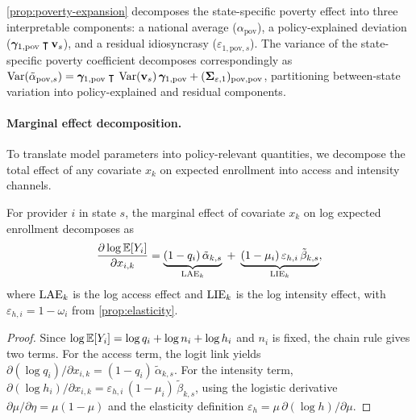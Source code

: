 \cref{prop:poverty-expansion} decomposes the state-specific poverty effect into
three interpretable components: a national average ($\alpha_{\mathrm{pov}}$), a
policy-explained deviation ($\boldsymbol{\gamma}_{1,\mathrm{pov}}\intercal\mathbf{v}_s$), and a residual
idiosyncrasy ($\varepsilon_{1,\mathrm{pov},s}$).  The variance of the
state-specific poverty coefficient decomposes correspondingly as
$\operatorname*{Var}(\tilde{\alpha}_{\mathrm{pov},s}) =
\boldsymbol{\gamma}_{1,\mathrm{pov}}\intercal\,\operatorname*{Var}(\mathbf{v}_s)\,\boldsymbol{\gamma}_{1,\mathrm{pov}}
+ (\boldsymbol{\Sigma}_{\varepsilon,1})_{\mathrm{pov,pov}}$,
partitioning between-state variation into policy-explained and residual
components.

\paragraph{Marginal effect decomposition.}
To translate model parameters into policy-relevant quantities, we decompose the
total effect of any covariate $x_k$ on expected enrollment into access and
intensity channels.

\begin{proposition}
  \label{prop:lae-lie}
  For provider $i$ in state $s$, the marginal effect of covariate $x_k$ on
  log expected enrollment decomposes as
  \begin{equation}\label{eq:lae-lie}
    \frac{\partial \log \mathbb{E}[Y_i]}{\partial x_{i,k}}
    = \underbrace{(1 - q_i)\,\tilde{\alpha}_{k,s}}_{\operatorname{LAE}_k}
    \;+\;
    \underbrace{(1 - \mu_i)\,\varepsilon_{h,i}\,\tilde{\beta}_{k,s}}_{\operatorname{LIE}_k},
  \end{equation}
  where $\operatorname{LAE}_k$ is the log access effect and $\operatorname{LIE}_k$ is the log
  intensity effect, with $\varepsilon_{h,i} = 1 - \omega_i$ from
  \cref{prop:elasticity}.
\end{proposition}

\begin{proof}
  Since $\log\mathbb{E}[Y_i] = \log q_i + \log n_i + \log h_i$ and $n_i$ is fixed,
  the chain rule gives two terms. For the access term, the logit link yields
  $\partial(\log q_i)/\partial x_{i,k} = (1 - q_i)\,\tilde{\alpha}_{k,s}$.
  For the intensity term,
  $\partial(\log h_i)/\partial x_{i,k}
  = \varepsilon_{h,i}\,(1-\mu_i)\,\tilde{\beta}_{k,s}$,
  using the logistic derivative $\partial\mu/\partial\eta = \mu(1-\mu)$
  and the elasticity definition
  $\varepsilon_{h} = \mu\,\partial(\log h)/\partial\mu$.
\end{proof}

